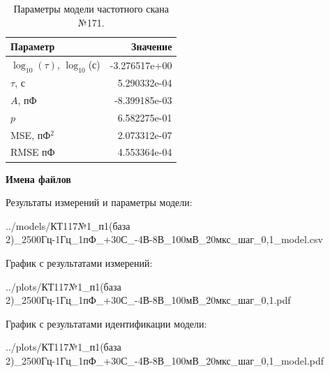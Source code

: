 \begin{table}[!ht]
    \centering
    \caption{Параметры модели частотного скана №171.}
    \begin{tabular}{|l|r|}
        \hline
        Параметр                                       & Значение                  \\ \hline
        $\log_{10}(\tau)$, $\log_{10}$(с)              & -3.276517e+00             \\ \hline
        $\tau$, с                                      & 5.290332e-04              \\ \hline
        $A$, пФ                                        & -8.399185e-03             \\ \hline
        $p$                                            & 6.582275e-01              \\ \hline
        MSE, пФ$^2$                                    & 2.073312e-07              \\ \hline
        RMSE пФ                                        & 4.553364e-04              \\ \hline
    \end{tabular}
    \label{table:frequency_scan_model_171}
\end{table}

\textbf{Имена файлов}

Результаты измерений и параметры модели:

\scriptsize../models/КТ117№1\_п1(база 2)\_2500Гц-1Гц\_1пФ\_+30С\_-4В-8В\_100мВ\_20мкс\_шаг\_0,1\_model.csv
\normalsize

График с результатами измерений:

\scriptsize../plots/КТ117№1\_п1(база 2)\_2500Гц-1Гц\_1пФ\_+30С\_-4В-8В\_100мВ\_20мкс\_шаг\_0,1.pdf
\normalsize

График с результатами идентификации модели:

\scriptsize../plots/КТ117№1\_п1(база 2)\_2500Гц-1Гц\_1пФ\_+30С\_-4В-8В\_100мВ\_20мкс\_шаг\_0,1\_model.pdf
\normalsize

